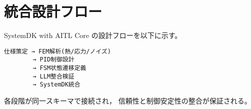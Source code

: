 \section{統合設計フロー}
SystemDK with AITL Core の設計フローを以下に示す。
\begin{verbatim}
仕様策定 → FEM解析(熱/応力/ノイズ)
        → PID制御設計
        → FSM状態遷移定義
        → LLM整合検証
        → SystemDK統合
\end{verbatim}
各段階が同一スキーマで接続され，
信頼性と制御安定性の整合が保証される。
